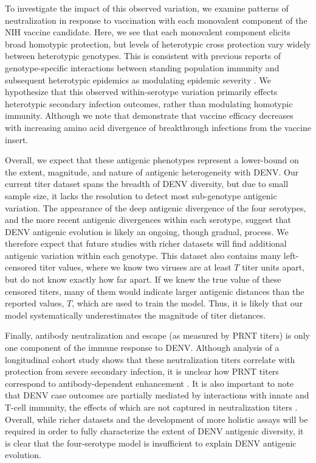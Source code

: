 \documentclass[11pt,oneside,letterpaper]{article}
\begin{document}
To investigate the impact of this observed variation, we examine patterns of neutralization in response to vaccination with each monovalent component of the NIH vaccine candidate.
Here, we see that each monovalent component elicits broad homotypic protection, but levels of heterotypic cross protection vary widely between heterotypic genotypes.
This is consistent with previous reports of genotype-specific interactions between standing population immunity and subsequent heterotypic epidemics as modulating epidemic severity \citep{ohainle2011dynamics, kochel2002effect}.
We hypothesize that this observed within-serotype variation primarily effects heterotypic secondary infection outcomes, rather than modulating homotypic immunity.
Although we note that \citet{juraska2018viral} demonstrate that vaccine efficacy decreases with increasing amino acid divergence of breakthrough infections from the vaccine insert.

Overall, we expect that these antigenic phenotypes represent a lower-bound on the extent, magnitude, and nature of antigenic heterogeneity with DENV.
Our current titer dataset spans the breadth of DENV diversity, but due to small sample size, it lacks the resolution to detect most sub-genotype antigenic variation.
The appearance of the deep antigenic divergence of the four serotypes, and the more recent antigenic divergences within each serotype, suggest that DENV antigenic evolution is likely an ongoing, though gradual, process.
We therefore expect that future studies with richer datasets will find additional antigenic variation within each genotype.
This dataset also contains many left-censored titer values, where we know two viruses are at least $T$ titer units apart, but do not know exactly how far apart.
If we knew the true value of these censored titers, many of them would indicate larger antigenic distances than the reported values, $T$, which are used to train the model.
Thus, it is likely that our model systematically underestimates the magnitude of titer distances.

Finally, antibody neutralization and escape (as measured by PRNT titers) is only one component of the immune response to DENV.
Although analysis of a longitudinal cohort study shows that these neutralization titers correlate with protection from severe secondary infection, it is unclear how PRNT titers correspond to antibody-dependent enhancement \citep{katzelnick2016neutralizing}.
It is also important to note that DENV case outcomes are partially mediated by interactions with innate and T-cell immunity, the effects of which are not captured in neutralization titers \citep{green2014innate}.
Overall, while richer datasets and the development of more holistic assays will be required in order to fully characterize the extent of DENV antigenic diversity, it is clear that the four-serotype model is insufficient to explain DENV antigenic evolution.
\end{document}
